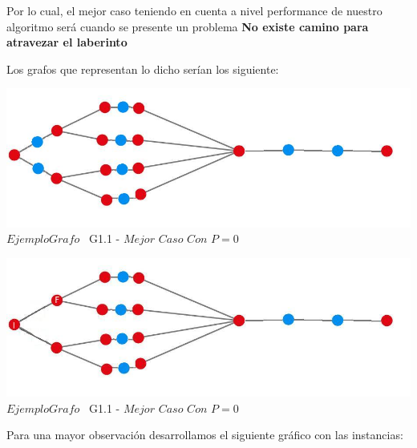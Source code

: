 Por lo cual, el mejor caso teniendo en cuenta a nivel performance de nuestro algoritmo ser\'a cuando se presente un problema \textbf{No existe camino para atravezar el laberinto}

Los grafos que representan lo dicho ser\'ian los siguiente:\\

\vspace*{0.3cm} \vspace*{0.3cm}
  \begin{center}
\includegraphics[scale=0.65]{./EJ1/ej1grafomejorcaso.jpeg}
{$Ejemplo Grafo$ \ G1.1 - $Mejor$ $Caso$ $Con$ $P=0$ }
  \end{center}
  \vspace*{0.3cm}

\vspace*{0.3cm} \vspace*{0.3cm}
  \begin{center}
\includegraphics[scale=0.65]{./EJ1/ej1grafomejorcaso2.jpeg}
{$Ejemplo Grafo$ \ G1.1 - $Mejor$ $Caso$ $Con$ $P=0$ }
  \end{center}
  \vspace*{0.3cm}

Para una mayor observaci\'on desarrollamos el siguiente gr\'afico con las instancias:\\

